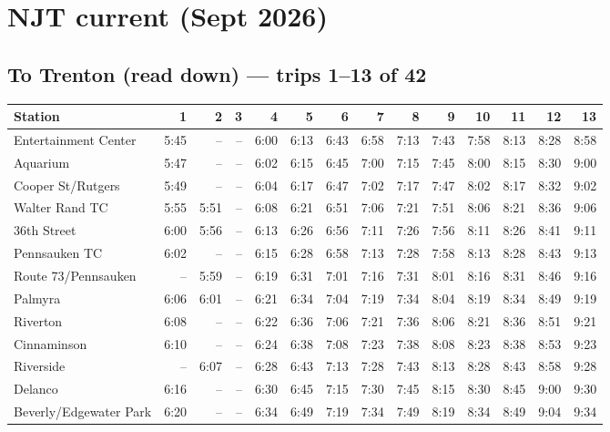 \section{NJT current (Sept 2026)}\label{tt:njt_current}
\subsection*{To Trenton (read down) --- trips 1--13 of 42}
\begin{center}\footnotesize\setlength{\tabcolsep}{3pt}\begin{tabular}{@{}lrrrrrrrrrrrrr@{}}\toprule
Station & 1 & 2 & 3 & 4 & 5 & 6 & 7 & 8 & 9 & 10 & 11 & 12 & 13 \\\midrule
Entertainment Center & 5:45 & -- & -- & 6:00 & 6:13 & 6:43 & 6:58 & 7:13 & 7:43 & 7:58 & 8:13 & 8:28 & 8:58 \\
Aquarium & 5:47 & -- & -- & 6:02 & 6:15 & 6:45 & 7:00 & 7:15 & 7:45 & 8:00 & 8:15 & 8:30 & 9:00 \\
Cooper St/Rutgers & 5:49 & -- & -- & 6:04 & 6:17 & 6:47 & 7:02 & 7:17 & 7:47 & 8:02 & 8:17 & 8:32 & 9:02 \\
Walter Rand TC & 5:55 & 5:51 & -- & 6:08 & 6:21 & 6:51 & 7:06 & 7:21 & 7:51 & 8:06 & 8:21 & 8:36 & 9:06 \\
36th Street & 6:00 & 5:56 & -- & 6:13 & 6:26 & 6:56 & 7:11 & 7:26 & 7:56 & 8:11 & 8:26 & 8:41 & 9:11 \\
Pennsauken TC & 6:02 & -- & -- & 6:15 & 6:28 & 6:58 & 7:13 & 7:28 & 7:58 & 8:13 & 8:28 & 8:43 & 9:13 \\
Route 73/Pennsauken & -- & 5:59 & -- & 6:19 & 6:31 & 7:01 & 7:16 & 7:31 & 8:01 & 8:16 & 8:31 & 8:46 & 9:16 \\
Palmyra & 6:06 & 6:01 & -- & 6:21 & 6:34 & 7:04 & 7:19 & 7:34 & 8:04 & 8:19 & 8:34 & 8:49 & 9:19 \\
Riverton & 6:08 & -- & -- & 6:22 & 6:36 & 7:06 & 7:21 & 7:36 & 8:06 & 8:21 & 8:36 & 8:51 & 9:21 \\
Cinnaminson & 6:10 & -- & -- & 6:24 & 6:38 & 7:08 & 7:23 & 7:38 & 8:08 & 8:23 & 8:38 & 8:53 & 9:23 \\
Riverside & -- & 6:07 & -- & 6:28 & 6:43 & 7:13 & 7:28 & 7:43 & 8:13 & 8:28 & 8:43 & 8:58 & 9:28 \\
Delanco & 6:16 & -- & -- & 6:30 & 6:45 & 7:15 & 7:30 & 7:45 & 8:15 & 8:30 & 8:45 & 9:00 & 9:30 \\
Beverly/Edgewater Park & 6:20 & -- & -- & 6:34 & 6:49 & 7:19 & 7:34 & 7:49 & 8:19 & 8:34 & 8:49 & 9:04 & 9:34 \\

\end{tabular}
\end{center}
